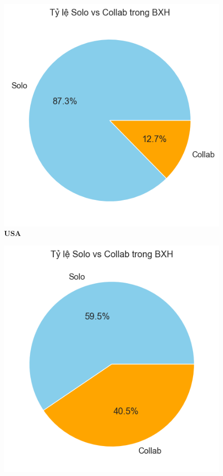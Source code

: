 \begin{itemize}
    \begin{figure}[H]
        \centering
        \begin{minipage}{0.38\textwidth}
            \centering
            \includegraphics[width=\linewidth]{../graphics/data_top50/figure/21/EDA_usa.png}
            \\[4pt] {\small \textbf{USA}}
        \end{minipage}
        \hfill
        \begin{minipage}{0.38\textwidth}
            \centering
            \includegraphics[width=\linewidth]{../graphics/data_top50/figure/21/EDA_spain.png}

\end{minipage}
\end{figure}
\end{itemize}
